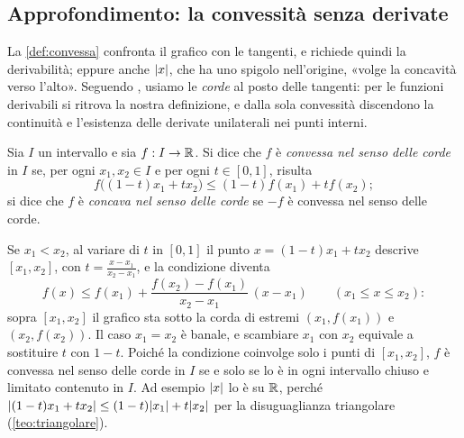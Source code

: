 \subsection{Approfondimento: la convessità senza derivate}
\label{subsec:convessita-corde}

La \cref{def:convessa} confronta il grafico con le tangenti, e richiede quindi la
derivabilità; eppure anche $\lvert x\rvert$, che ha uno spigolo nell'origine, «volge la concavità
verso l'alto». Seguendo \cite{giusti}, usiamo le \emph{corde} al posto delle tangenti:
per le funzioni derivabili si ritrova la nostra definizione, e dalla sola convessità
discendono la continuità e l'esistenza delle derivate unilaterali nei punti interni.

\begin{definizione}\label{def:convessa-corde}
Sia $I$ un intervallo e sia $f:I\to\mathbb{R}$. Si dice che $f$ è \emph{convessa nel senso delle
corde} in $I$ se, per ogni $x_{1},x_{2}\in I$ e per ogni $t\in[0,1]$, risulta
\begin{equation}\label{eq:convessa-corde}
  f\bigl((1-t)x_{1}+tx_{2}\bigr)\le(1-t)f(x_{1})+tf(x_{2}) ;
\end{equation}
si dice che $f$ è \emph{concava nel senso delle corde} se $-f$ è convessa nel senso
delle corde.
\end{definizione}

Se $x_{1}<x_{2}$, al variare di $t$ in $[0,1]$ il punto $x=(1-t)x_{1}+tx_{2}$ descrive
$[x_{1},x_{2}]$, con $t=\frac{x-x_{1}}{x_{2}-x_{1}}$, e la condizione diventa
\begin{equation}\label{eq:corda-sopra}
  f(x)\le f(x_{1})+\frac{f(x_{2})-f(x_{1})}{x_{2}-x_{1}}\,(x-x_{1})
  \qquad (x_{1}\le x\le x_{2}) :
\end{equation}
sopra $[x_{1},x_{2}]$ il grafico sta sotto la corda di estremi $(x_{1},f(x_{1}))$ e
$(x_{2},f(x_{2}))$. Il caso $x_{1}=x_{2}$ è banale, e scambiare $x_{1}$ con $x_{2}$
equivale a sostituire $t$ con $1-t$. Poiché la condizione coinvolge solo i punti di
$[x_{1},x_{2}]$, $f$ è convessa nel senso delle corde in $I$ se e solo se lo è in ogni
intervallo chiuso e limitato contenuto in $I$. Ad esempio $\lvert x\rvert$ lo è su $\mathbb{R}$, perché
$\lvert (1-t)x_{1}+tx_{2}\rvert\le(1-t)\lvert x_{1}\rvert+t\lvert x_{2}\rvert$ per la disuguaglianza
triangolare (\cref{teo:triangolare}).


